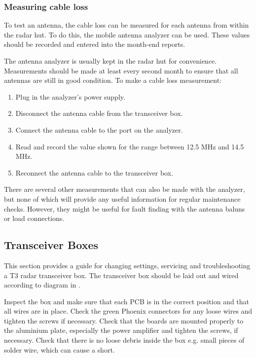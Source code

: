 \subsubsection{Measuring cable loss}
To test an antenna, the cable loss can be measured for each antenna from within the radar hut. To do this, the mobile antenna analyzer can be used. These values should be recorded and entered into the month-end reports.
\par
The antenna analyzer is usually kept in the radar hut for convenience. Measurements should be made at least every second month to ensure that all antennas are still in good condition. To make a cable loss measurement:
\begin{enumerate}
	\item Plug in the analyzer's power supply.
	\item Disconnect the antenna cable from the transceiver box.
	\item Connect the antenna cable to the port on the analyzer.
	\item Read and record the value shown for the range between 12.5 MHz and 14.5 MHz.
	\item Reconnect the antenna cable to the transceiver box.
\end{enumerate}
\par
There are several other measurements that can also be made with the analyzer, but none of which will provide any useful information for regular maintenance checks. However, they might be useful for fault finding with the antenna baluns or load connections.

\clearpage

\subsection{Transceiver Boxes}
\label{subsec:hw_boxes}

This section provides a guide for changing settings, servicing and troubleshooting a T3 radar transceiver box. The transceiver box should be laid out and wired according to diagram in .
\par
Inspect the box and make sure that each PCB is in the correct position and that all wires are in place. Check the green Phoenix connectors for any loose wires and tighten the screws if necessary. Check that the boards are mounted properly to the aluminium plate, especially the power amplifier and tighten the screws, if necessary. Check that there is no loose debris inside the box e.g. small pieces of solder wire, which can cause a short.


